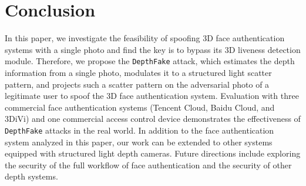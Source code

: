 \section{Conclusion}

In this paper, we investigate the feasibility of spoofing 3D face authentication systems with a single photo and find the key is to bypass its 3D liveness detection module.
Therefore, we propose the \texttt{DepthFake} attack, which estimates the depth information from a single photo, modulates it to a structured light scatter pattern, and projects such a scatter pattern  on the adversarial photo of a legitimate user to spoof the 3D face authentication system.
Evaluation with three commercial face authentication systems (Tencent Cloud, Baidu Cloud, and 3DiVi) and one commercial access control device demonstrates the effectiveness of \texttt{DepthFake}  attacks in the real world. In addition to the face authentication system analyzed in this paper, our work can be extended to other systems equipped with structured light depth cameras. Future directions include exploring the security of the full workflow of face authentication and the security of other depth systems.